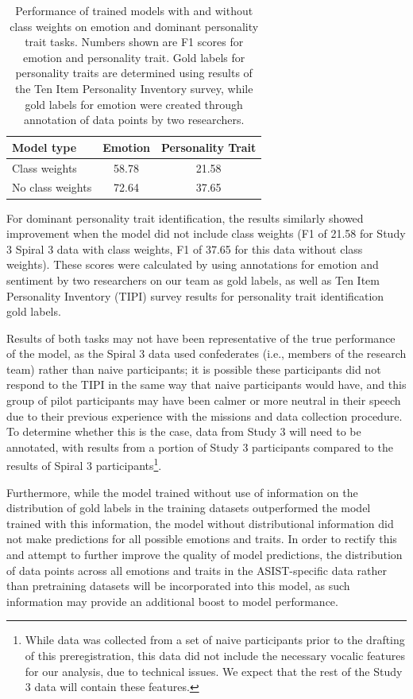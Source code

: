 \begin{table}
    \small
    \centering
    \begin{tabular}{lcc}
        \hline
        Model type & Emotion & Personality Trait \\
        \hline
        Class weights & 58.78 & 21.58 \\
        No class weights & 72.64 & 37.65 \\
        \hline
    \end{tabular}
    \caption{Performance of trained models with and without class weights on
    emotion and dominant personality trait tasks. Numbers shown are F1 scores
    for emotion and personality trait. Gold labels for personality traits are
    determined using results of the Ten Item Personality Inventory survey,
    while gold labels for emotion were created through annotation of data
    points by two researchers.
    }
    \label{tab:spiral3_analysis}
\end{table}

For dominant personality trait identification, the results similarly showed
improvement when the model did not include class weights (F1 of 21.58 for Study
3 Spiral 3 data with class weights, F1 of 37.65 for this data without class
weights). These scores were calculated by using annotations for emotion and
sentiment by two researchers on our team as gold labels, as well as Ten Item
Personality Inventory (TIPI) survey results for personality trait
identification gold labels.

Results of both tasks may not have been representative of the true performance
of the model, as the Spiral 3 data used confederates (i.e., members of the
research team) rather than naive participants; it is possible these
participants did not respond to the TIPI in the same way that naive
participants would have, and this group of pilot participants may have been
calmer or more neutral in their speech due to their previous experience with
the missions and data collection procedure. To determine whether this is the
case, data from Study 3 will need to be annotated, with results from a portion
of Study 3 participants compared to the results of Spiral 3
participants\footnote{While data was collected from a set of naive participants
prior to the drafting of this preregistration, this data did not include the
necessary vocalic features for our analysis, due to technical issues. We expect
that the rest of the Study 3 data will contain these features.}.

Furthermore, while the model trained without use of information on the distribution
of gold labels in the training datasets outperformed the model trained with this
information, the model without distributional information did not make predictions
for all possible emotions and traits. In order to rectify this and attempt to
further improve the quality of model predictions, the distribution of data points
across all emotions and traits in the ASIST-specific data rather than pretraining
datasets will be incorporated into this model, as such information may provide an
additional boost to model performance.

